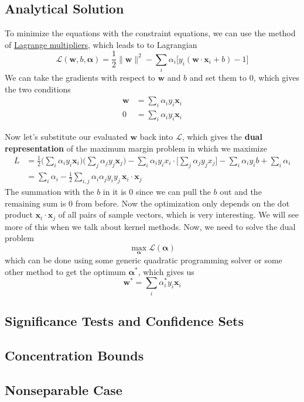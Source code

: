 \subsection{Analytical Solution} 

  To minimize the equations with the constraint equations, we can use the method of \hyperref[mv-thm:lagrange-multipliers-theorem]{Lagrange multipliers}, which leads to to Lagrangian 
  \begin{equation}
    \mathcal{L}(\mathbf{w}, b, \boldsymbol{\alpha}) = \frac{1}{2} \|\mathbf{w}\|^2 - \sum_i \alpha_i \big[ y_i (\mathbf{w} \cdot \mathbf{x}_i + b) - 1\big]
  \end{equation}
  We can take the gradients with respect to $\mathbf{w}$ and $b$ and set them to $0$, which gives the two conditions 
  \begin{align*} 
    \mathbf{w} & = \sum_i \alpha_i y_i \mathbf{x}_i \\
    0 & = \sum_i \alpha_i y_i \mathbf{x}_i 
  \end{align*}

  Now let's substitute our evaluated $\mathbf{w}$ back into $\mathcal{L}$, which gives the \textbf{dual representation} of the maximum margin problem in which we maximize  
  \begin{align*} 
      L & = \frac{1}{2} \bigg( \sum_i \alpha_i y_i \mathbf{x}_i \bigg) \bigg( \sum_j \alpha_j y_j \mathbf{x}_j \bigg) - \sum_{i} \alpha_i y_i x_i \cdot \bigg[ \sum_j \alpha_j y_j x_j \bigg] - \sum_i \alpha_i y_i b + \sum_i \alpha_i \\ 
        & = \sum_i \alpha_i - \frac{1}{2} \sum_{i, j} \alpha_i \alpha_j y_i y_j \, \mathbf{x}_i \cdot \mathbf{x}_j 
  \end{align*}
  The summation with the $b$ in it is $0$ since we can pull the $b$ out and the remaining sum is $0$ from before. Now the optimization only depends on the dot product $\mathbf{x}_i \cdot \mathbf{x}_j$ of all pairs of sample vectors, which is very interesting. We will see more of this when we talk about kernel methods. Now, we need to solve the dual problem 
  \begin{equation}
    \max_{\boldsymbol{\alpha}} \mathcal{L}(\boldsymbol{\alpha})
  \end{equation}
  which can be done using some generic quadratic programming solver or some other method to get the optimum $\boldsymbol{\alpha}^\ast$, which gives us 
  \begin{equation}
    \mathbf{w}^\ast = \sum_i \alpha_i^\ast y_i \mathbf{x}_i
  \end{equation}

\subsection{Significance Tests and Confidence Sets}

\subsection{Concentration Bounds} 

\subsection{Nonseparable Case} 

